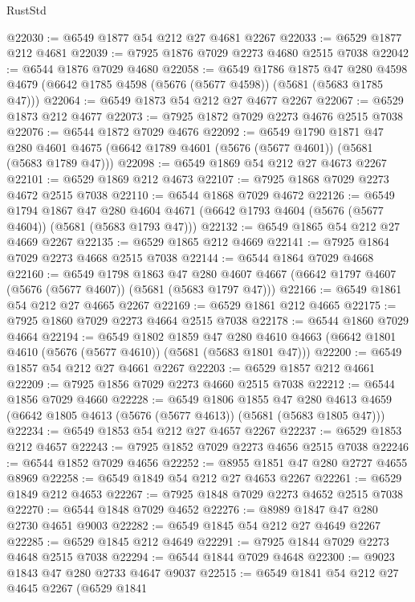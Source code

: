\begin{lexlean}{RustStd}
\begin{coremodule}
@22030 := @6549 @1877 @54 @212 @27 @4681 @2267
@22033 := @6529 @1877 @212 @4681
@22039 := @7925 @1876 @7029 @2273 @4680 @2515 @7038
@22042 := @6544 @1876 @7029 @4680
@22058 := @6549
    @1786
    @1875
    @47
    @280
    @4598
    @4679
    (@6642 @1785 @4598 (@5676 (@5677 @4598)) (@5681 (@5683 @1785 @47)))
@22064 := @6549 @1873 @54 @212 @27 @4677 @2267
@22067 := @6529 @1873 @212 @4677
@22073 := @7925 @1872 @7029 @2273 @4676 @2515 @7038
@22076 := @6544 @1872 @7029 @4676
@22092 := @6549
    @1790
    @1871
    @47
    @280
    @4601
    @4675
    (@6642 @1789 @4601 (@5676 (@5677 @4601)) (@5681 (@5683 @1789 @47)))
@22098 := @6549 @1869 @54 @212 @27 @4673 @2267
@22101 := @6529 @1869 @212 @4673
@22107 := @7925 @1868 @7029 @2273 @4672 @2515 @7038
@22110 := @6544 @1868 @7029 @4672
@22126 := @6549
    @1794
    @1867
    @47
    @280
    @4604
    @4671
    (@6642 @1793 @4604 (@5676 (@5677 @4604)) (@5681 (@5683 @1793 @47)))
@22132 := @6549 @1865 @54 @212 @27 @4669 @2267
@22135 := @6529 @1865 @212 @4669
@22141 := @7925 @1864 @7029 @2273 @4668 @2515 @7038
@22144 := @6544 @1864 @7029 @4668
@22160 := @6549
    @1798
    @1863
    @47
    @280
    @4607
    @4667
    (@6642 @1797 @4607 (@5676 (@5677 @4607)) (@5681 (@5683 @1797 @47)))
@22166 := @6549 @1861 @54 @212 @27 @4665 @2267
@22169 := @6529 @1861 @212 @4665
@22175 := @7925 @1860 @7029 @2273 @4664 @2515 @7038
@22178 := @6544 @1860 @7029 @4664
@22194 := @6549
    @1802
    @1859
    @47
    @280
    @4610
    @4663
    (@6642 @1801 @4610 (@5676 (@5677 @4610)) (@5681 (@5683 @1801 @47)))
@22200 := @6549 @1857 @54 @212 @27 @4661 @2267
@22203 := @6529 @1857 @212 @4661
@22209 := @7925 @1856 @7029 @2273 @4660 @2515 @7038
@22212 := @6544 @1856 @7029 @4660
@22228 := @6549
    @1806
    @1855
    @47
    @280
    @4613
    @4659
    (@6642 @1805 @4613 (@5676 (@5677 @4613)) (@5681 (@5683 @1805 @47)))
@22234 := @6549 @1853 @54 @212 @27 @4657 @2267
@22237 := @6529 @1853 @212 @4657
@22243 := @7925 @1852 @7029 @2273 @4656 @2515 @7038
@22246 := @6544 @1852 @7029 @4656
@22252 := @8955 @1851 @47 @280 @2727 @4655 @8969
@22258 := @6549 @1849 @54 @212 @27 @4653 @2267
@22261 := @6529 @1849 @212 @4653
@22267 := @7925 @1848 @7029 @2273 @4652 @2515 @7038
@22270 := @6544 @1848 @7029 @4652
@22276 := @8989 @1847 @47 @280 @2730 @4651 @9003
@22282 := @6549 @1845 @54 @212 @27 @4649 @2267
@22285 := @6529 @1845 @212 @4649
@22291 := @7925 @1844 @7029 @2273 @4648 @2515 @7038
@22294 := @6544 @1844 @7029 @4648
@22300 := @9023 @1843 @47 @280 @2733 @4647 @9037
@22515 := @6549
    @1841
    @54
    @212
    @27
    @4645
    @2267
    (@6529
      @1841

\end{coremodule}
\end{lexlean}
